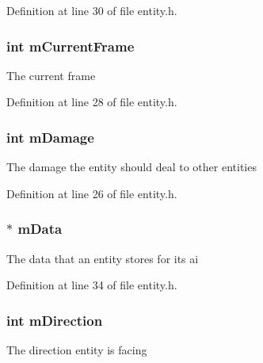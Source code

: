 Definition at line 30 of file entity.\+h.

\subsubsection[{\texorpdfstring{m\+Current\+Frame}{mCurrentFrame}}]{\setlength{\rightskip}{0pt plus 5cm}int m\+Current\+Frame}\hypertarget{structentity__s_a4bf029653a0ffc8ad5dfddd243aeff72}{}\label{structentity__s_a4bf029653a0ffc8ad5dfddd243aeff72}
The current frame 

Definition at line 28 of file entity.\+h.

\subsubsection[{\texorpdfstring{m\+Damage}{mDamage}}]{\setlength{\rightskip}{0pt plus 5cm}int m\+Damage}\hypertarget{structentity__s_a890d42df13307b51280d145a6b05211d}{}\label{structentity__s_a890d42df13307b51280d145a6b05211d}
The damage the entity should deal to other entities 

Definition at line 26 of file entity.\+h.

\subsubsection[{\texorpdfstring{m\+Data}{mData}}]{$\ast$ m\+Data}\hypertarget{structentity__s_af3ccc93f657a50bc80718e0fe9ad367f}{}\label{structentity__s_af3ccc93f657a50bc80718e0fe9ad367f}
The data that an entity stores for its ai 

Definition at line 34 of file entity.\+h.

\subsubsection[{\texorpdfstring{m\+Direction}{mDirection}}]{\setlength{\rightskip}{0pt plus 5cm}int m\+Direction}\hypertarget{structentity__s_ada44c567bee8dbfa47693d4068507cab}{}\label{structentity__s_ada44c567bee8dbfa47693d4068507cab}
The direction entity is facing 

